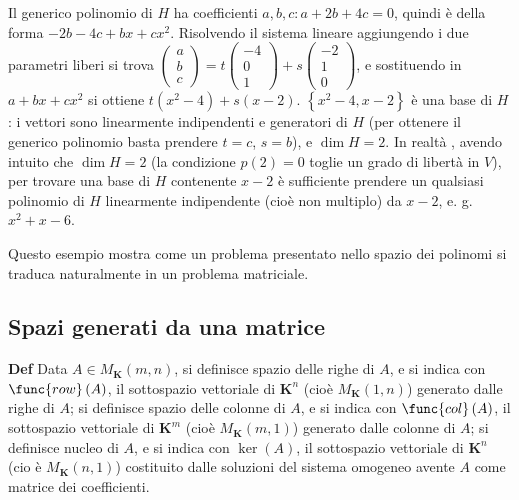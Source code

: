 \documentclass{article}
\begin{document}
\begin{enumerate}
\begin{enumerate}
Il generico polinomio di $H$ ha coefficienti $a,b,c:a+2b+4c=0$, quindi \`{e}
della forma $-2b-4c+bx+cx^{2}$. Risolvendo il sistema lineare aggiungendo i
due parametri liberi si trova $\left( 
\begin{array}{c}
a \\ 
b \\ 
c%
\end{array}%
\right) =t\left( 
\begin{array}{c}
-4 \\ 
0 \\ 
1%
\end{array}%
\right) +s\left( 
\begin{array}{c}
-2 \\ 
1 \\ 
0%
\end{array}%
\right) $, e sostituendo in $a+bx+cx^{2}$ si ottiene $t\left( x^{2}-4\right)
+s\left( x-2\right) $. $\left\{ x^{2}-4,x-2\right\} $ \`{e} una base di $H$:
i vettori sono linearmente indipendenti e generatori di $H$ (per ottenere il
generico polinomio basta prendere $t=c$, $s=b$), e $\dim H=2$. In realt\`{a}%
, avendo intuito che $\dim H=2$ (la condizione $p\left( 2\right) =0$ toglie
un grado di libert\`{a} in $V$), per trovare una base di $H$ contenente $x-2$
\`{e} sufficiente prendere un qualsiasi polinomio di $H$ linearmente
indipendente (cio\`{e} non multiplo) da $x-2$, e. g. $x^{2}+x-6$.
\end{enumerate}
\end{enumerate}

Questo esempio mostra come un problema presentato nello spazio dei polinomi
si traduca naturalmente in un problema matriciale.

\subsection{Spazi generati da una matrice}

\textbf{Def} Data $A\in M_{\mathbf{K}}\left( m,n\right) $, si definisce
spazio delle righe di $A$, e si indica con $\func{row}\left( A\right) $, il
sottospazio vettoriale di $\mathbf{K}^{n}$ (cio\`{e} $M_{\mathbf{K}}\left(
1,n\right) $) generato dalle righe di $A$; si definisce spazio delle colonne
di $A$, e si indica con $\func{col}\left( A\right) $, il sottospazio
vettoriale di $\mathbf{K}^{m}$ (cio\`{e} $M_{\mathbf{K}}\left( m,1\right) $)
generato dalle colonne di $A$; si definisce nucleo di $A$, e si indica con $%
\ker \left( A\right) $, il sottospazio vettoriale di $\mathbf{K}^{n}$ (cio%
\`{e} $M_{\mathbf{K}}\left( n,1\right) $) costituito dalle soluzioni del
sistema omogeneo avente $A$ come matrice dei coefficienti.
\end{document}
